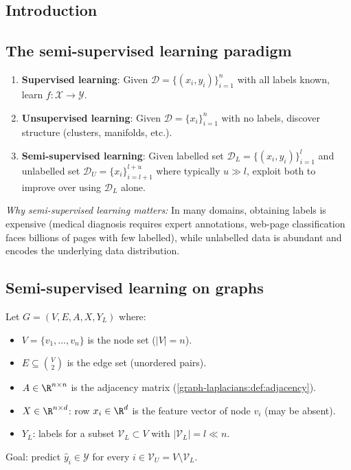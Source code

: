 \begin{notechapter}
\section{Introduction}

\subsection{The semi-supervised learning paradigm}

\begin{definition}
\label{semi-supervised-graphs:def:paradigms}
\leavevmode
\begin{enumerate}
    \item \textbf{Supervised learning}: Given $\mathcal{D} = \{(x_i, y_i)\}_{i=1}^n$
      with all labels known, learn $f: \mathcal{X} \to \mathcal{Y}$.
    \item \textbf{Unsupervised learning}: Given $\mathcal{D} = \{x_i\}_{i=1}^n$
      with no labels, discover structure (clusters, manifolds, etc.).
    \item \textbf{Semi-supervised learning}: Given labelled set
      $\mathcal{D}_L = \{(x_i, y_i)\}_{i=1}^l$ and unlabelled set
      $\mathcal{D}_U = \{x_i\}_{i=l+1}^{l+u}$ where typically $u \gg l$,
      exploit both to improve over using $\mathcal{D}_L$ alone.
\end{enumerate}
\end{definition}

\begin{intuition}
\emph{Why semi-supervised learning matters:}
In many domains, obtaining labels is expensive (medical diagnosis requires
expert annotations, web-page classification faces billions of pages with few
labelled), while unlabelled data is abundant and encodes the underlying data
distribution.
\end{intuition}

\subsection{Semi-supervised learning on graphs}

\begin{definition}
\label{semi-supervised-graphs:def:ssl_graph}
Let $G = (V, E, A, X, Y_L)$ where:
\begin{itemize}
    \item $V = \{v_1, \ldots, v_n\}$ is the node set ($|V|=n$).
    \item $E \subseteq \binom{V}{2}$ is the edge set (unordered pairs).
    \item $A \in \R^{n \times n}$ is the adjacency matrix
      (\cref{graph-laplacians:def:adjacency}).
    \item $X \in \R^{n \times d}$: row $x_i \in \R^d$ is the feature vector
      of node $v_i$ (may be absent).
    \item $Y_L$: labels for a subset $\mathcal{V}_L \subset V$ with
      $|\mathcal{V}_L| = l \ll n$.
\end{itemize}
Goal: predict $\hat{y}_i \in \mathcal{Y}$ for every $i \in \mathcal{V}_U =
V \setminus \mathcal{V}_L$.
\end{definition}


\end{notechapter}
